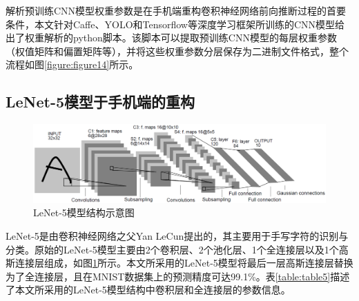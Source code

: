 解析预训练CNN模型权重参数是在手机端重构卷积神经网络前向推断过程的首要条件，本文针对Caffe、YOLO和Tensorflow等深度学习框架所训练的CNN模型给出了权重解析的python脚本。该脚本可以提取预训练CNN模型的每层权重参数（权值矩阵和偏置矩阵等），并将这些权重参数分层保存为二进制文件格式，整个流程如图\ref{figure:figure14}所示。

\subsection{LeNet-5模型于手机端的重构}

\begin{figure}[htbp]
    \centering
    \includegraphics[width=1.0\textwidth]{figures/lenet.pdf}
    \caption{LeNet-5模型结构示意图 \cite{lecun1998gradient}}\label{figure:figure15}
\end{figure}

LeNet-5是由卷积神经网络之父Yan LeCun提出的，其主要用于手写字符的识别与分类。原始的LeNet-5模型主要由2个卷积层、2个池化层、1个全连接层以及1个高斯连接层组成，如图\ref{figure:figure15}所示。本文所采用的LeNet-5模型将最后一层高斯连接层替换为了全连接层，且在MNIST数据集\cite{lecun.com}上的预测精度可达99.1\%。表\ref{table:table5}描述了本文所采用的LeNet-5模型结构中卷积层和全连接层的参数信息。
\vspace{-1.5em}
\begin{table}[htbp]
  \centering
  \caption{LeNet-5模型结构中的卷积层和全连接层}
  \label{table:table5}
\end{table}
\vspace{-0.5em}

